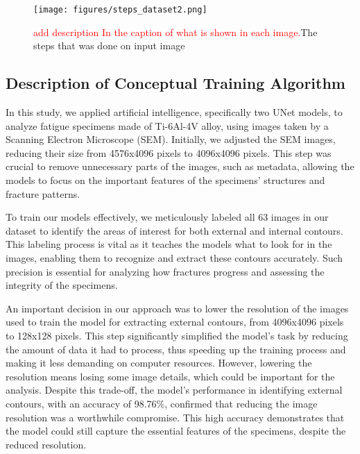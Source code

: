 \documentclass[preprint,12pt]{elsarticle}
\begin{document}
\begin{figure}[t!]
  \centering

  \begin{minipage}{1\textwidth}
    \centering
    \texttt{[image: figures/steps\_dataset2.png]}
    \caption{\textcolor{red}{add description In the caption of what is shown in each image.}The steps that was done on input image}
    \label{steps}
  \end{minipage}

\end{figure}

\subsection{Description of Conceptual Training Algorithm} \label{sec:alg_train}
In this study, we applied artificial intelligence, specifically two UNet models, to analyze fatigue specimens made of Ti-6Al-4V alloy, using images taken by a Scanning Electron Microscope (SEM). Initially, we adjusted the SEM images, reducing their size from 4576x4096 pixels to 4096x4096 pixels. This step was crucial to remove unnecessary parts of the images, such as metadata, allowing the models to focus on the important features of the specimens' structures and fracture patterns.

To train our models effectively, we meticulously labeled all 63 images in our dataset to identify the areas of interest for both external and internal contours. This labeling process is vital as it teaches the models what to look for in the images, enabling them to recognize and extract these contours accurately. Such precision is essential for analyzing how fractures progress and assessing the integrity of the specimens.

An important decision in our approach was to lower the resolution of the images used to train the model for extracting external contours, from 4096x4096 pixels to 128x128 pixels. This step significantly simplified the model's task by reducing the amount of data it had to process, thus speeding up the training process and making it less demanding on computer resources. However, lowering the resolution means losing some image details, which could be important for the analysis. Despite this trade-off, the model's performance in identifying external contours, with an accuracy of 98.76\%, confirmed that reducing the image resolution was a worthwhile compromise. This high accuracy demonstrates that the model could still capture the essential features of the specimens, despite the reduced resolution.
\end{document}
